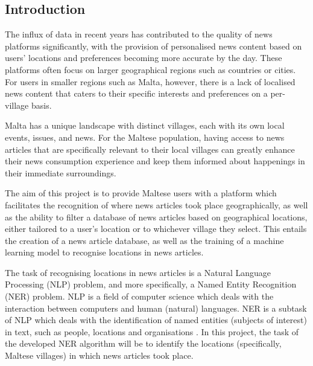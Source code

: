 \documentclass[a4paper, oneside, 11pt]{article}
\begin{document}
\begin{multicols*}{2}

  \begin{abstract}
    \textit{
      \lipsum[1]
    }
  \end{abstract}


  \section{Introduction}
  The influx of data in recent years has contributed to the quality of news platforms significantly, with the provision of personalised news content based on users' locations and preferences becoming more accurate by the day. These platforms often focus on larger geographical regions such as countries or cities. For users in smaller regions such as Malta, however, there is a lack of localised news content that caters to their specific interests and preferences on a per-village basis.

  Malta has a unique landscape with distinct villages, each with its own local events, issues, and news. For the Maltese population, having access to news articles that are specifically relevant to their local villages can greatly enhance their news consumption experience and keep them informed about happenings in their immediate surroundings.

  The aim of this project is to provide Maltese users with a platform which facilitates the recognition of where news articles took place geographically, as well as the ability to filter a database of news articles based on geographical locations, either tailored to a user's location or to whichever village they select. This entails the creation of a news article database, as well as the training of a machine learning model to recognise locations in news articles.

  The task of recognising locations in news articles is a Natural Language Processing (NLP) problem, and more specifically, a Named Entity Recognition (NER) problem. NLP is a field of computer science which deals with the interaction between computers and human (natural) languages. NER is a subtask of NLP which deals with the identification of named entities (subjects of interest) in text, such as people, locations and organisations \cite{nadeau2007survey}. In this project, the task of the developed NER algorithm will be to identify the locations (specifically, Maltese villages) in which news articles took place.


\end{multicols*}
\end{document}
